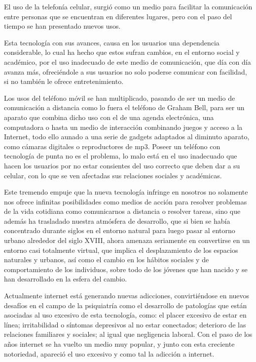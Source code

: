 \documentclass[10pt,a4paper]{article}
\begin{document}
El uso de la telefon{\'i}a celular, surgi{\'o} como un medio para facilitar la comunicaci{\'o}n entre personas que se encuentran en diferentes lugares, pero con el paso del tiempo se han presentado nuevos usos.

Esta tecnolog{\'i}a con sus avances, causa en los usuarios una dependencia considerable, lo cual ha hecho que estos sufran cambios, en el entorno social y acad{\'e}mico, por el uso inadecuado de este medio de comunicaci{\'o}n, que d{\'i}a con d{\'i}a avanza m{\'a}s, ofreci{\'e}ndole a sus usuarios no solo poderse comunicar con facilidad, si no tambi{\'e}n le ofrece entretenimiento.

Los usos del tel{\'e}fono m{\'o}vil se han multiplicado, pasando de ser un medio de comunicaci{\'o}n a distancia como lo fuera el tel{\'e}fono de Graham Bell, para ser un aparato que combina dicho uso con el de una agenda electr{\'o}nica, una computadora o hasta un medio de interacci{\'o}n combinando juegos y acceso a la Internet, todo ello aunado a una serie de gadgets adaptados al diminuto aparato, como c{\'a}maras digitales o reproductores de mp3.
Poseer un tel{\'e}fono con tecnolog{\'i}a de punta no es el problema, lo malo est{\'a} en el uso inadecuado que hacen los usuarios por no estar consientes del uso correcto que deben dar a su celular, con lo que se ven afectadas sus relaciones sociales y acad{\'e}micas.

Este tremendo empuje que la nueva tecnolog{\'i}a infringe en nosotros no solamente nos ofrece infinitas posibilidades como medios de acci{\'o}n para resolver problemas de la vida cotidiana como comunicarnos a distancia o resolver tareas, sino que adem{\'a}s ha trasladado nuestra atm{\'o}sfera de desarrollo, que si bien se hab{\'i}a concentrado durante siglos en el entorno natural para luego pasar al entorno urbano alrededor del siglo XVIII, ahora amenaza seriamente en convertirse en un entorno casi totalmente virtual, que implica el desplazamiento de los espacios naturales y urbanos, as{\'i} como el cambio en los h{\'a}bitos sociales y de comportamiento de los individuos, sobre todo de los j{\'o}venes que han nacido y se han desarrollado en la esfera del cambio.

Actualmente internet est{\'a} generando nuevas adicciones, convirti{\'e}ndose en nuevos desaf{\'i}os en el campo de la psiquiatr{\'i}a como el desarrollo de patolog{\'i}as que est{\'a}n asociadas al uso excesivo de esta tecnolog{\'i}a, como: el placer excesivo de estar en l{\'i}nea; irritabilidad o s{\'i}ntomas depresivos al no estar conectados; deterioro de las relaciones familiares y sociales; al igual que negligencia laboral. Con el paso de los a{\~n}os internet se ha vuelto un medio muy popular, y junto con esta creciente notoriedad, apareci{\'o} el uso excesivo y como tal la adicci{\'o}n a internet.
\end{document}
